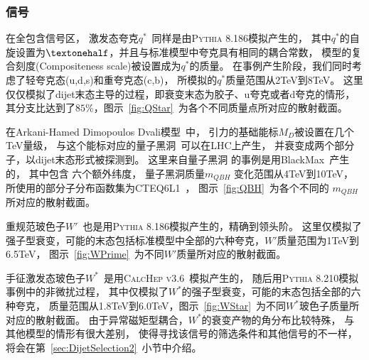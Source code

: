 \subsubsection{信号}
\label{sec:DijetMCSignal}

在全包含信号区，
激发态夸克$q^*$~\cite{qstar1,qstar2}同样是由\textsc{Pythia 8.186}模拟产生的，
其中$q^*$的自旋设置为$\textonehalf$，并且与标准模型中夸克具有相同的耦合常数，
模型的复合刻度(Compositeness scale)被设置成为$q^*$的质量。
在事例产生阶段，我们同时考虑了轻夸克态(u,d,s)和重夸克态(c,b)，
所模拟的$q^*$质量范围从2TeV到8TeV。
这里仅仅模拟了dijet末态主导的过程，即衰变末态为胶子、u夸克或者d夸克的情形，
其分支比达到了$85\%$，图示~\ref{fig:QStar}~为各个不同质量点所对应的散射截面。

在Arkani-Hamed Dimopoulos Dvali模型~\cite{ADD}中，
引力的基础能标$M_{D}$被设置在几个TeV量级，
与这个能标对应的量子黑洞~\cite{qbh1,qbh2}可以在LHC上产生，
并衰变成两个部分子，以dijet末态形式被探测到。
这里来自量子黑洞
的事例是用BlackMax~\cite{Dai:BlackMax}产生的，
其中包含
六个额外纬度，
量子黑洞质量$m_{QBH}$
变化范围从4TeV到10TeV，
所使用的部分子分布函数集为CTEQ6L1~\cite{Pumplin:2002vw}，
图示~\ref{fig:QBH}~为各个不同的
$m_{QBH}$所对应的散射截面。

重规范玻色子$W\prime$~\cite{wprime1}也是用\textsc{Pythia 8.186}模拟产生的，精确到领头阶。
这里仅模拟了强子型衰变，可能的末态包括标准模型中全部的六种夸克，$W\prime$质量范围为1TeV到6.5TeV，
图示~\ref{fig:WPrime}~为不同$W\prime$质量所对应的散射截面。

手征激发态玻色子$W^*$~\cite{Chizhov:2009fc,Chizhov:2010jg}是用\textsc{CalcHep v3.6}~\cite{CalcHEP}模拟产生的，
随后用\textsc{Pythia 8.210}模拟事例中的非微扰过程，
其中仅模拟了$W^*$的强子型衰变，可能的末态包括全部的六种夸克，
质量范围从1.8TeV到6.0TeV，图示~\ref{fig:WStar}~为不同$W^*$玻色子质量所对应的散射截面。
由于异常磁矩型耦合，$W^*$的衰变产物的角分布比较特殊，
与其他模型的情形有很大差别，
使得寻找该信号的筛选条件和其他信号的不一样，
将会在第~\ref{sec:DijetSelection2}~小节中介绍。

